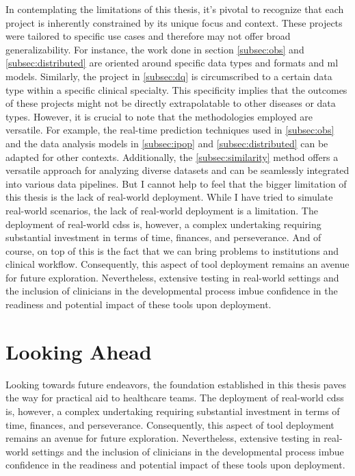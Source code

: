 In contemplating the limitations of this thesis, it's pivotal to recognize that each project is inherently constrained by its unique focus and context. These projects were tailored to specific use cases and therefore may not offer broad generalizability. For instance, the work done in section \ref{subsec:obs} and \ref{subsec:distributed} are oriented around specific data types and formats and \ac{ml} models. Similarly, the project in \ref{subsec:dq} is circumscribed to a certain data type within a specific clinical specialty. This specificity implies that the outcomes of these projects might not be directly extrapolatable to other diseases or data types. However, it is crucial to note that the methodologies employed are versatile. For example, the real-time prediction techniques used in \ref{subsec:obs} and the data analysis models in \ref{subsec:ipop} and \ref{subsec:distributed} can be adapted for other contexts. Additionally, the \ref{subsec:similarity} method offers a versatile approach for analyzing diverse datasets and can be seamlessly integrated into various data pipelines.
But I cannot help to feel that the bigger limitation of this thesis is the lack of real-world deployment. While I have tried to simulate real-world scenarios, the lack of real-world deployment is a limitation. The deployment of real-world \ac{cdss} is, however, a complex undertaking requiring substantial investment in terms of time, finances, and perseverance. And of course, on top of this is the fact that we can bring problems to institutions and clinical workflow. Consequently, this aspect of tool deployment remains an avenue for future exploration. Nevertheless, extensive testing in real-world settings and the inclusion of clinicians in the developmental process imbue confidence in the readiness and potential impact of these tools upon deployment.



\section{Looking Ahead}

Looking towards future endeavors, the foundation established in this thesis paves the way for practical aid to healthcare teams. The deployment of real-world \ac{cdss} is, however, a complex undertaking requiring substantial investment in terms of time, finances, and perseverance. Consequently, this aspect of tool deployment remains an avenue for future exploration. Nevertheless, extensive testing in real-world settings and the inclusion of clinicians in the developmental process imbue confidence in the readiness and potential impact of these tools upon deployment.


